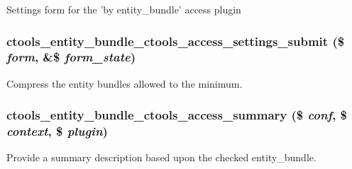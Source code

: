 \label{entity__bundle_8inc_a7b36ad469be2bc71a28ba43fb19f7410}
Settings form for the 'by entity\_\-bundle' access plugin \hypertarget{entity__bundle_8inc_a8d3c688375e0c75f155050ba85f36485}{
\subsubsection[{ctools\_\-entity\_\-bundle\_\-ctools\_\-access\_\-settings\_\-submit}]{\setlength{\rightskip}{0pt plus 5cm}ctools\_\-entity\_\-bundle\_\-ctools\_\-access\_\-settings\_\-submit (\$ {\em form}, \/  \&\$ {\em form\_\-state})}}
\label{entity__bundle_8inc_a8d3c688375e0c75f155050ba85f36485}
Compress the entity bundles allowed to the minimum. \hypertarget{entity__bundle_8inc_aa413c3bc5e958f83359460f29f8401e3}{
\subsubsection[{ctools\_\-entity\_\-bundle\_\-ctools\_\-access\_\-summary}]{\setlength{\rightskip}{0pt plus 5cm}ctools\_\-entity\_\-bundle\_\-ctools\_\-access\_\-summary (\$ {\em conf}, \/  \$ {\em context}, \/  \$ {\em plugin})}}
\label{entity__bundle_8inc_aa413c3bc5e958f83359460f29f8401e3}
Provide a summary description based upon the checked entity\_\-bundle. 

